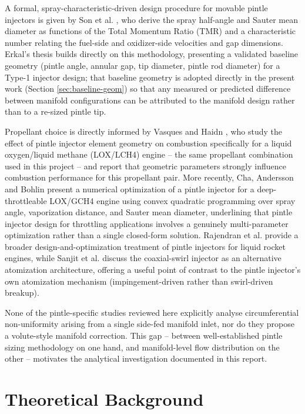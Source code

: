 \documentclass[11pt,a4paper]{article}
\begin{document}
A formal, spray-characteristic-driven design procedure for movable pintle injectors is given by Son et al. \cite{son2017}, who derive the spray half-angle and Sauter mean diameter as functions of the Total Momentum Ratio (TMR) and a characteristic number relating the fuel-side and oxidizer-side velocities and gap dimensions. Erkal's thesis \cite{erkal2019} builds directly on this methodology, presenting a validated baseline geometry (pintle angle, annular gap, tip diameter, pintle rod diameter) for a Type-1 injector design; that baseline geometry is adopted directly in the present work (Section \ref{sec:baseline-geom}) so that any measured or predicted difference between manifold configurations can be attributed to the manifold design rather than to a re-sized pintle tip.

Propellant choice is directly informed by Vasques and Haidn \cite{vasques2017}, who study the effect of pintle injector element geometry on combustion specifically for a liquid oxygen/liquid methane (LOX/LCH4) engine -- the same propellant combination used in this project -- and report that geometric parameters strongly influence combustion performance for this propellant pair. More recently, Cha, Andersson and Bohlin \cite{cha2023} present a numerical optimization of a pintle injector for a deep-throttleable LOX/GCH4 engine using convex quadratic programming over spray angle, vaporization distance, and Sauter mean diameter, underlining that pintle injector design for throttling applications involves a genuinely multi-parameter optimization rather than a single closed-form solution. Rajendran et al. \cite{rajendran2020} provide a broader design-and-optimization treatment of pintle injectors for liquid rocket engines, while Sanjit et al. \cite{sanjit_aaj} discuss the coaxial-swirl injector as an alternative atomization architecture, offering a useful point of contrast to the pintle injector's own atomization mechanism (impingement-driven rather than swirl-driven breakup).

None of the pintle-specific studies reviewed here explicitly analyse circumferential non-uniformity arising from a single side-fed manifold inlet, nor do they propose a volute-style manifold correction. This gap -- between well-established pintle sizing methodology on one hand, and manifold-level flow distribution on the other -- motivates the analytical investigation documented in this report.

\section{Theoretical Background}
\end{document}
